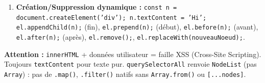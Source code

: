 \documentclass[11pt]{article}
\newcommand{\cle}[1]{{\popxbold\color{popdark}#1}}
\begin{document}
\begin{methode}
\begin{enumerate}
\begin{itemize}
                  \item Attributs : \texttt{el.getAttribute('href')}, \texttt{el.setAttribute('disabled', '')}, \texttt{el.removeAttribute('hidden')}, \texttt{el.hasAttribute('required')}.
                  \item Propriétés DOM directes (préférées pour \texttt{value}, \texttt{checked}, \texttt{disabled}, \texttt{className}, \texttt{id}, \texttt{style}) :
                        \texttt{el.value}, \texttt{el.checked}, \texttt{el.disabled = true}, \texttt{el.id},
                        \texttt{el.classList.add('erreur')}, \texttt{el.classList.remove('valide')}, \texttt{el.classList.toggle('actif')}, \texttt{el.classList.contains('cache')}.
                  \item Styles inline : \texttt{el.style.backgroundColor = 'red'} (camelCase), \texttt{el.style.cssText = 'color: white; font-weight: bold;'}.
              \end{itemize}
        \item \textbf{Création/Suppression dynamique :}
              \texttt{const n = document.createElement('div'); n.textContent = 'Hi'; el.appendChild(n);} (fin), \texttt{el.prepend(n);} (début), \texttt{el.before(n);} (avant), \texttt{el.after(n);} (après), \texttt{el.remove();}, \texttt{el.replaceWith(nouveauNoeud);}.
    \end{enumerate}
    \textbf{Attention :} \texttt{innerHTML} + données utilisateur = faille \cle{XSS} (Cross-Site Scripting). Toujours \texttt{textContent} pour texte pur. \texttt{querySelectorAll} renvoie \texttt{NodeList} (pas \texttt{Array}) : pas de \texttt{.map()}, \texttt{.filter()} natifs sans \texttt{Array.from()} ou \texttt{[...nodes]}.
\end{methode}
\end{document}
